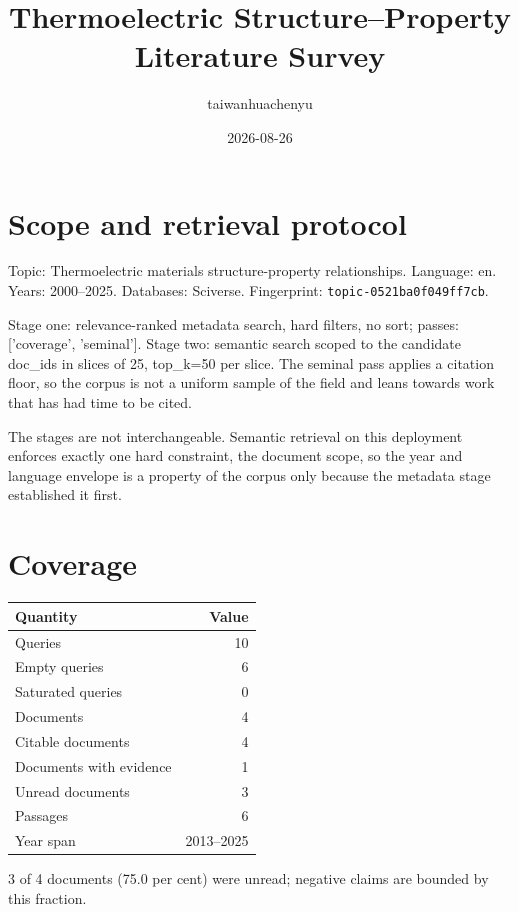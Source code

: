 \documentclass[11pt,a4paper]{article}
\title{Thermoelectric Structure--Property Literature Survey}
\author{taiwanhuachenyu}
\date{2026-08-26}
\begin{document}
\maketitle
\tableofcontents

\section{Scope and retrieval protocol}
Topic: Thermoelectric materials structure-property relationships. Language: en. Years: 2000--2025. Databases: Sciverse. Fingerprint: \texttt{topic-0521ba0f049ff7cb}.

Stage one: relevance-ranked metadata search, hard filters, no sort; passes: ['coverage', 'seminal']. Stage two: semantic search scoped to the candidate doc\_ids in slices of 25, top\_k=50 per slice. The seminal pass applies a citation floor, so the corpus is not a uniform sample of the field and leans towards work that has had time to be cited.

The stages are not interchangeable. Semantic retrieval on this deployment enforces exactly one hard constraint, the document scope, so the year and language envelope is a property of the corpus only because the metadata stage established it first.

\section{Coverage}
\begin{tabular}{lr}
\toprule
Quantity & Value \\
\midrule
Queries & 10 \\
Empty queries & 6 \\
Saturated queries & 0 \\
Documents & 4 \\
Citable documents & 4 \\
Documents with evidence & 1 \\
Unread documents & 3 \\
Passages & 6 \\
Year span & 2013--2025 \\
\bottomrule
\end{tabular}

3 of 4 documents (75.0 per cent) were unread; negative claims are bounded by this fraction.
\end{document}
